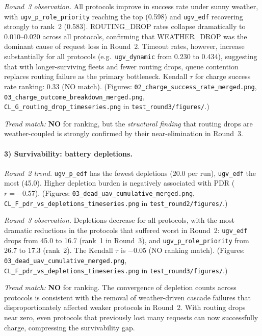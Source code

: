 \emph{Round~3 observation.}
All protocols improve in success rate under sunny weather, with
\texttt{ugv\_p\_role\_priority} reaching the top (0.598) and
\texttt{ugv\_edf} recovering strongly to rank~2 (0.583).
ROUTING\_DROP rates collapse dramatically to 0.010--0.020 across all
protocols, confirming that WEATHER\_DROP was the dominant cause of
request loss in Round~2.
Timeout rates, however, increase substantially for all protocols
(e.g.\ \texttt{ugv\_dynamic} from 0.230 to 0.434), suggesting that
with longer-surviving fleets and fewer routing drops, queue contention
replaces routing failure as the primary bottleneck.
Kendall $\tau$ for charge success rate ranking: 0.33 (NO match).
(Figures: \texttt{02\_charge\_success\_rate\_merged.png},
\texttt{03\_charge\_outcome\_breakdown\_merged.png},
\texttt{CL\_G\_routing\_drop\_timeseries.png} in
\texttt{test\_round3/figures/}.)

\emph{Trend match:} \textbf{NO} for ranking, but the \emph{structural
finding} that routing drops are weather-coupled is strongly confirmed
by their near-elimination in Round~3.

\paragraph{3) Survivability: battery depletions.}

\emph{Round~2 trend.}
\texttt{ugv\_p\_edf} has the fewest depletions (20.0 per run),
\texttt{ugv\_edf} the most (45.0).  Higher depletion burden is
negatively associated with PDR ($r = -0.57$).
(Figures: \texttt{03\_dead\_uav\_cumulative\_merged.png},
\texttt{CL\_F\_pdr\_vs\_depletions\_timeseries.png} in
\texttt{test\_round2/figures/}.)

\emph{Round~3 observation.}
Depletions decrease for all protocols, with the most dramatic
reductions in the protocols that suffered worst in Round~2:
\texttt{ugv\_edf} drops from 45.0 to 16.7 (rank~1 in Round~3),
and \texttt{ugv\_p\_role\_priority} from 26.7 to 17.3 (rank~2).
The Kendall $\tau$ is $-0.05$ (NO ranking match).
(Figures: \texttt{03\_dead\_uav\_cumulative\_merged.png},
\texttt{CL\_F\_pdr\_vs\_depletions\_timeseries.png} in
\texttt{test\_round3/figures/}.)

\emph{Trend match:} \textbf{NO} for ranking.  The convergence of
depletion counts across protocols is consistent with the removal of
weather-driven cascade failures that disproportionately affected weaker
protocols in Round~2.  With routing drops near zero, even protocols
that previously lost many requests can now successfully charge,
compressing the survivability gap.

